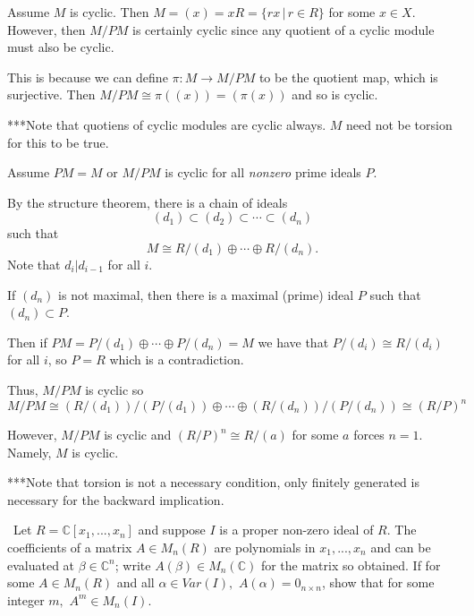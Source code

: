 \documentclass[12pt]{Qual}
\begin{document}
\begin{solution}$\,$

\boxed{\implies} Assume $M$ is cyclic. Then $M=(x)=xR=\{rx\,|\,r\in R\}$ for some $x\in X$. However, then $M/PM$ is certainly cyclic since any quotient of a cyclic module must also be cyclic.

    This is because we can define $\pi:M\to M/PM$ to be the quotient map, which is surjective. Then $M/PM\cong \pi((x))=(\pi(x))$ and so is cyclic.

    \begin{mybox}
    ***Note that quotiens of cyclic modules are cyclic always. $M$ need not be torsion for this to be true.
    \end{mybox}

    \boxed{\impliedby} Assume $PM=M$ or $M/PM$ is cyclic for all \textit{nonzero} prime ideals $P$.

    By the structure theorem, there is a chain of ideals $$(d_1)\subset(d_2)\subset\cdots\subset(d_n)$$ such that $$M\cong R/(d_1)\oplus\cdots\oplus R/(d_n).$$ Note that $d_i|d_{i-1}$ for all $i$.

    If $(d_n)$ is not maximal, then there is a maximal (prime) ideal $P$ such that $(d_n)\subset P$.

    Then if $PM=P/(d_1)\oplus\cdots\oplus P/(d_n)=M$ we have that $P/(d_i)\cong R/(d_i)$ for all $i$, so $P=R$ which is a contradiction.

    Thus, $M/PM$ is cyclic so $$M/PM\cong (R/(d_1))/(P/(d_1))\oplus\cdots\oplus(R/(d_n))/(P/(d_n))\cong (R/P)^n$$

    However, $M/PM$ is cyclic and $(R/P)^n\cong R/(a)$ for some $a$ forces $n=1.$ Namely, $M$ is cyclic.

    \begin{mybox}
    ***Note that torsion is not a necessary condition, only finitely generated is necessary for the backward implication.
    \end{mybox}
\end{solution}
\newpage



\begin{problem} $\,$
Let $R=\mathbb{C}[x_1,...,x_n]$ and suppose $I$ is a proper non-zero ideal of $R$. The coefficients of a matrix $A\in M_n(R)$ are polynomials in $x_1,...,x_n$ and can be evaluated at $\beta\in\mathbb{C}^n$; write $A(\beta)\in M_n(\mathbb{C})$ for the matrix so obtained. If for some $A\in M_n(R)$ and all $\alpha\in Var(I),$ $A(\alpha)=0_{n\times n}$, show that for some integer $m,$ $A^m\in M_n(I).$
\end{problem}
\end{document}
